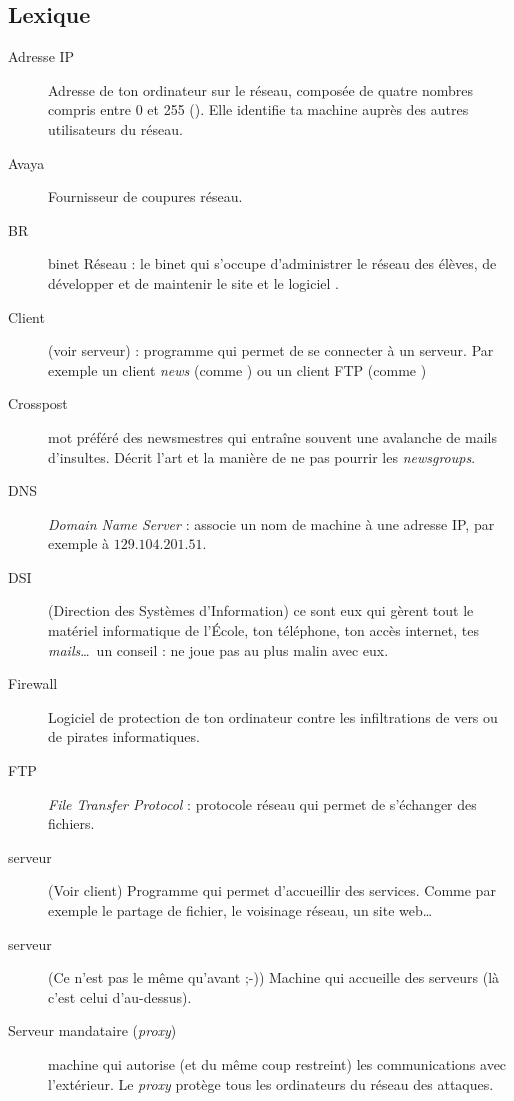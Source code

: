 \subsection{Lexique}

\begin{description}
  \item[Adresse IP] Adresse de ton ordinateur sur le réseau, composée de quatre nombres compris entre 0 et 255  (). Elle identifie ta machine auprès des autres utilisateurs du réseau.
  \item[Avaya] Fournisseur de coupures réseau.
  \item[BR] binet Réseau : le binet qui s'occupe d'administrer le réseau des élèves, de développer et de maintenir le site  et le logiciel .
  \item[Client] (voir serveur) : programme qui permet de se connecter à un serveur. Par exemple un client \emph{news} (comme ) ou un client FTP (comme )
  \item[Crosspost] mot préféré des newsmestres qui entraîne souvent une avalanche de mails d'insultes. Décrit l'art et la manière de ne pas pourrir les \emph{newsgroups}.
  \item[DNS] \emph{Domain Name Server} : associe un nom de machine à une adresse IP, par exemple  à  $129.104.201.51$.
  \item[DSI] (Direction des Systèmes d'Information) ce sont eux qui gèrent tout le matériel informatique de l'\'Ecole, ton téléphone, ton accès internet, tes \emph{mails}\ldots\ un conseil : ne joue pas au plus malin avec eux.
  \item[Firewall] Logiciel de protection de ton ordinateur contre les infiltrations de vers ou de pirates informatiques.
  \item[FTP] \emph{File Transfer Protocol} : protocole réseau qui permet de s'échanger des fichiers.
  \item[serveur] (Voir client) Programme qui permet d'accueillir des services. Comme par exemple le partage de fichier, le voisinage réseau, un site web\ldots\
  \item[serveur] (Ce n'est pas le même qu'avant ;-)) Machine qui accueille des serveurs (là c'est celui d'au-dessus).
    \item[Serveur mandataire (\emph{proxy})] machine qui autorise (et du même coup restreint) les communications avec l'extérieur. Le \emph{proxy} protège tous les ordinateurs du réseau des attaques.

\end{description}
